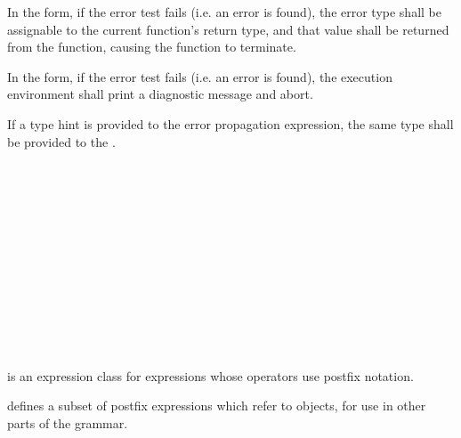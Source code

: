 \specsubsubitem
In the  form, if the error test fails (i.e. an error is found), the
error type shall be assignable to the current function's return type, and that
value shall be returned from the function, causing the function to terminate.

\specsubsubitem
In the \terminal{!} form, if the error test fails (i.e. an error is found), the
execution environment shall print a diagnostic message and abort.

\specsubsubitem
If a type hint is provided to the error propagation expression, the same type
shall be provided to the .


\begin{grammar}
 \\
	 \\
	 \\
	 \\
	 \\
	 \\
	 \\

 \\
	 \\
	 \\
	 \\
\end{grammar}

\specsubsubitem
{} is an expression class for expressions whose
operators use postfix notation.

\specsubsubitem
{} defines a subset of postfix expressions which
refer to objects, for use in other parts of the grammar.


\begin{grammar}
 \\
	 \\
	 \\
	 \\
	 \\
	 \\
	 \\
\end{grammar}


